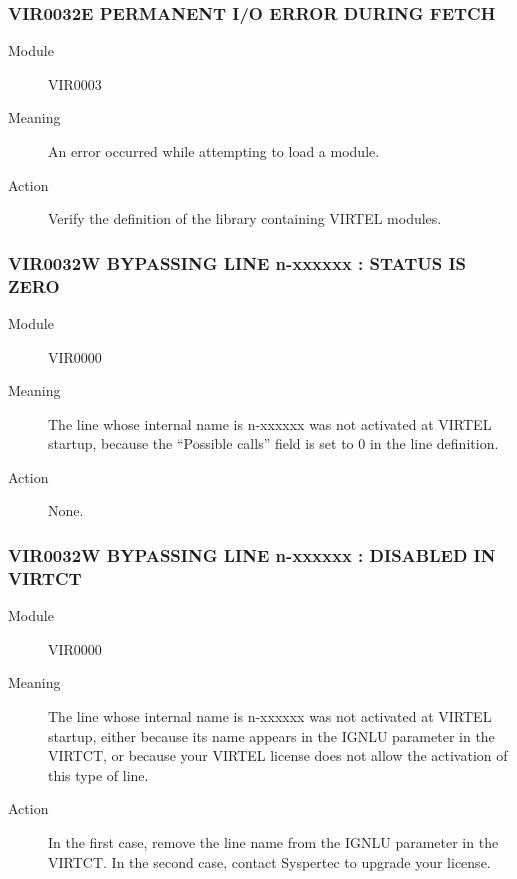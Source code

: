 \documentclass[letterpaper,10pt,english]{sphinxmanual}
\begin{document}
\subsubsection{VIR0032E PERMANENT I/O ERROR DURING FETCH}
\label{\detokenize{messages:vir0032e-permanent-i-o-error-during-fetch}}\begin{description}
\item[{Module}] \leavevmode
VIR0003

\item[{Meaning}] \leavevmode
An error occurred while attempting to load a module.

\item[{Action}] \leavevmode
Verify the definition of the library containing VIRTEL modules.

\end{description}


\subsubsection{VIR0032W BYPASSING LINE n-xxxxxx : STATUS IS ZERO}
\label{\detokenize{messages:vir0032w-bypassing-line-n-xxxxxx-status-is-zero}}\begin{description}
\item[{Module}] \leavevmode
VIR0000

\item[{Meaning}] \leavevmode
The line whose internal name is n-xxxxxx was not activated at VIRTEL startup, because the “Possible calls” field is set to 0 in the line definition.

\item[{Action}] \leavevmode
None.

\end{description}


\subsubsection{VIR0032W BYPASSING LINE n-xxxxxx : DISABLED IN VIRTCT}
\label{\detokenize{messages:vir0032w-bypassing-line-n-xxxxxx-disabled-in-virtct}}\begin{description}
\item[{Module}] \leavevmode
VIR0000

\item[{Meaning}] \leavevmode
The line whose internal name is n-xxxxxx was not activated at VIRTEL startup, either because its name appears in the IGNLU parameter in the VIRTCT, or because your VIRTEL license does not allow the activation of this type of line.

\item[{Action}] \leavevmode
In the first case, remove the line name from the IGNLU parameter in the VIRTCT. In the second case, contact Syspertec to upgrade your license.

\end{description}
\end{document}
